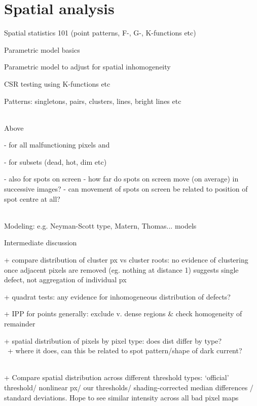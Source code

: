 \documentclass[../../IO-Pixels.tex]{subfiles}
\begin{document}
\section{Spatial analysis}
\begin{outline}
Spatial statistics 101 (point patterns, F-, G-, K-functions etc)

Parametric model basics

Parametric model to adjust for spatial inhomogeneity

CSR testing using K-functions etc

Patterns: singletons, pairs, clusters, lines, bright lines etc

\\
Above 

- for all malfunctioning pixels and 

- for subsets (dead, hot, dim etc)

- also for spots on screen
- how far do spots on screen move (on average) in successive images?
- can movement of spots on screen be related to position of spot centre at all?

\\
Modeling: e.g. Neyman-Scott type, Matern, Thomas... models

Intermediate discussion

+ compare distribution of cluster px vs cluster roots: no evidence of clustering once adjacent pixels are removed (eg. nothing at distance 1) suggests single defect, not aggregation of individual px

+ quadrat tests: any evidence for inhomogeneous distribution of defects?

+ IPP for points generally: exclude v. dense regions \& check homogeneity of remainder

+ spatial distribution of pixels by pixel type: does dist differ by type? \\
\-\ + where it does, can this be related to spot pattern/shape of dark current?

\\
+ Compare spatial distribution across different threshold types: `official' threshold/ nonlinear px/ our thresholds/ shading-corrected median differences / standard deviations. Hope to see similar intensity across all bad pixel maps
\end{outline}



\end{document}
